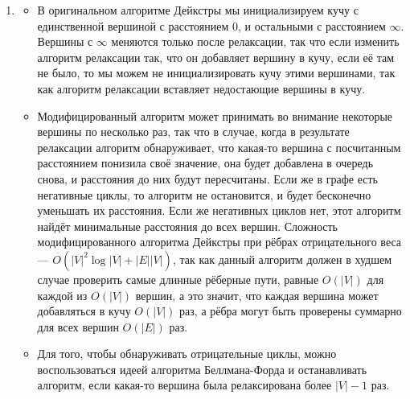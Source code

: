 \documentclass{article}
\begin{document}
\begin{enumerate}
\begin{lstlisting}
    sets = [set() for _ in range(w * (len(nodes) - 1) + 1)]
    sets[0].add(node)

    shortest_paths = {node: (0, [node])}

    for i in range(len(sets)):
        for node in sets[i]:
            for neighbor, weight in graph[node]:
                if neighbor not in shortest_paths:
                    sets[i + weight].add(neighbor)
                    shortest_paths[neighbor] = (
                        i + weight,
                        shortest_paths[node][1] + [neighbor],
                    )
                elif i + weight < shortest_paths[neighbor][0]:
                    sets[shortest_paths[neighbor][0]].remove(neighbor)
                    sets[i + weight].add(neighbor)
                    shortest_paths[neighbor] = (
                        i + weight,
                        shortest_paths[node][1] + [neighbor],
                    )

    return shortest_paths
    \end{lstlisting}

	\item
	      \begin{itemize}
		      \item[1.] В оригинальном алгоритме Дейкстры мы инициализируем кучу
			      с единственной вершиной с расстоянием 0, и остальными с
			      расстоянием $\infty$. Вершины с $\infty$ меняются только
			      после релаксации, так что если изменить алгоритм релаксации так,
			      что он добавляет вершину в кучу, если её там не было, то мы можем
			      не инициализировать кучу этими вершинами, так как алгоритм
			      релаксации вставляет недостающие вершины в кучу.

		      \item[2.] Модифицированный алгоритм может принимать во внимание
			      некоторые вершины по несколько раз, так что в случае, когда в
			      результате релаксации алгоритм обнаруживает, что какая-то вершина
			      с посчитанным расстоянием понизила своё значение, она будет добавлена
			      в очередь снова, и расстояния до них будут пересчитаны. Если же
			      в графе есть негативные циклы, то алгоритм не остановится, и будет
			      бесконечно уменьшать их расстояния. Если же негативных циклов нет,
			      этот алгоритм найдёт минимальные расстояния до всех вершин.
			      Сложность модифицированного алгоритма Дейкстры при рёбрах отрицательного
			      веса --- $O(|V|^2 \log |V| + |E||V|)$, так как данный алгоритм должен
			      в худшем случае проверить самые длинные рёберные пути,
			      равные $O(|V|)$ для каждой из $O(|V|)$ вершин, а это значит,
			      что каждая вершина может добавляться в кучу $O(|V|)$ раз, а
			      рёбра могут быть проверены суммарно для всех вершин $O(|E|)$
			      раз.

		      \item[3.] Для того, чтобы обнаруживать отрицательные циклы, можно
			      воспользоваться идеей алгоритма Беллмана-Форда и останавливать алгоритм,
			      если какая-то вершина была релаксирована более $|V| - 1$ раз.
	      \end{itemize}

\end{enumerate}
\end{document}
